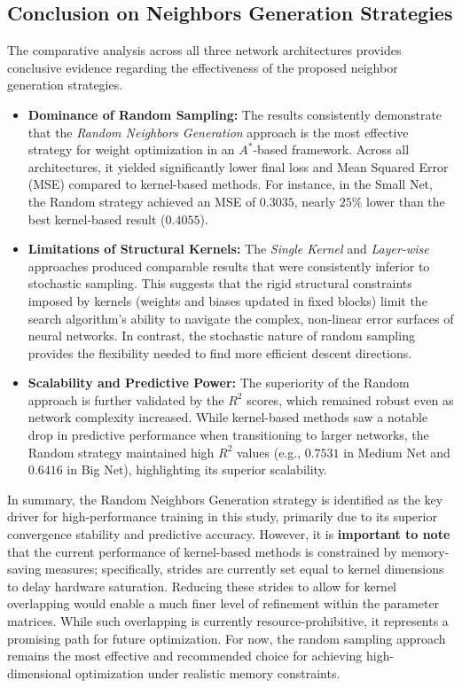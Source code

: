 \newpage

\subsection{Conclusion on Neighbors Generation Strategies}

The comparative analysis across all three network architectures provides conclusive evidence regarding the effectiveness of the proposed neighbor generation strategies.

\begin{itemize}
    \item \textbf{Dominance of Random Sampling:} The results consistently demonstrate that the \textit{Random Neighbors Generation} approach is the most effective strategy for weight optimization in an $A^*$-based framework. Across all architectures, it yielded significantly lower final loss and Mean Squared Error (MSE) compared to kernel-based methods. For instance, in the Small Net, the Random strategy achieved an MSE of $0.3035$, nearly $25\%$ lower than the best kernel-based result ($0.4055$).
    
    \item \textbf{Limitations of Structural Kernels:} The \textit{Single Kernel} and \textit{Layer-wise} approaches produced comparable results that were consistently inferior to stochastic sampling. This suggests that the rigid structural constraints imposed by kernels (weights and biases updated in fixed blocks) limit the search algorithm's ability to navigate the complex, non-linear error surfaces of neural networks. In contrast, the stochastic nature of random sampling provides the flexibility needed to find more efficient descent directions.
    
    \item \textbf{Scalability and Predictive Power:} The superiority of the Random approach is further validated by the $R^2$ scores, which remained robust even as network complexity increased. While kernel-based methods saw a notable drop in predictive performance when transitioning to larger networks, the Random strategy maintained high $R^2$ values (e.g., $0.7531$ in Medium Net and $0.6416$ in Big Net), highlighting its superior scalability.
    
\end{itemize}

In summary, the Random Neighbors Generation strategy is identified as the key driver for high-performance training in this study, primarily due to its superior convergence stability and predictive accuracy. However, it is \textbf{important to note} that the current performance of kernel-based methods is constrained by memory-saving measures; specifically, strides are currently set equal to kernel dimensions to delay hardware saturation. Reducing these strides to allow for kernel overlapping would enable a much finer level of refinement within the parameter matrices. While such overlapping is currently resource-prohibitive, it represents a promising path for future optimization. For now, the random sampling approach remains the most effective and recommended choice for achieving high-dimensional optimization under realistic memory constraints.

